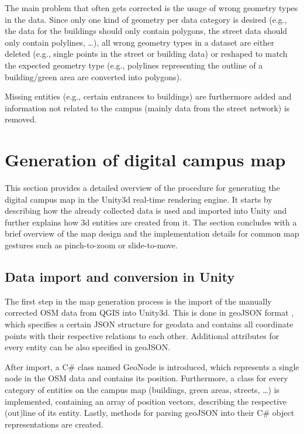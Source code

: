 The main problem that often gets corrected is the usage of wrong geometry types in the data. Since only one kind of geometry per data category is desired (e.g., the data for the buildings should only contain polygons, the street data should only contain polylines, \ldots), all wrong geometry types in a dataset are either deleted (e.g., single points in the street or building data) or reshaped to match the expected geometry type (e.g., polylines representing the outline of a building/green area are converted into polygons).

Missing entities (e.g., certain entrances to buildings) are furthermore added and information not related to the campus (mainly data from the street network) is removed.

\section{Generation of digital campus map}
This section provides a detailed overview of the procedure for generating the digital campus map in the Unity3d real-time rendering engine. It starts by describing how the already collected data is used and imported into Unity and further explains how 3d entities are created from it. The section concludes with a brief overview of the map design and the implementation details for common map gestures such as pinch-to-zoom or slide-to-move.

\subsection{Data import and conversion in Unity}
The first step in the map generation process is the import of the manually corrected OSM data from QGIS into Unity3d. This is done in geoJSON format \cite{geoJSON}, which specifies a certain JSON structure for geodata and contains all coordinate points with their respective relations to each other. Additional attributes for every entity can be also specified in geoJSON.

After import, a C\# class named GeoNode is introduced, which represents a single node in the OSM data and contains its position. Furthermore, a class for every category of entities on the campus map (buildings, green areas, streets, \ldots) is implemented, containing an array of position vectors, describing the respective (out)line of its entity. Lastly, methods for parsing geoJSON into their C\# object representations are created.

